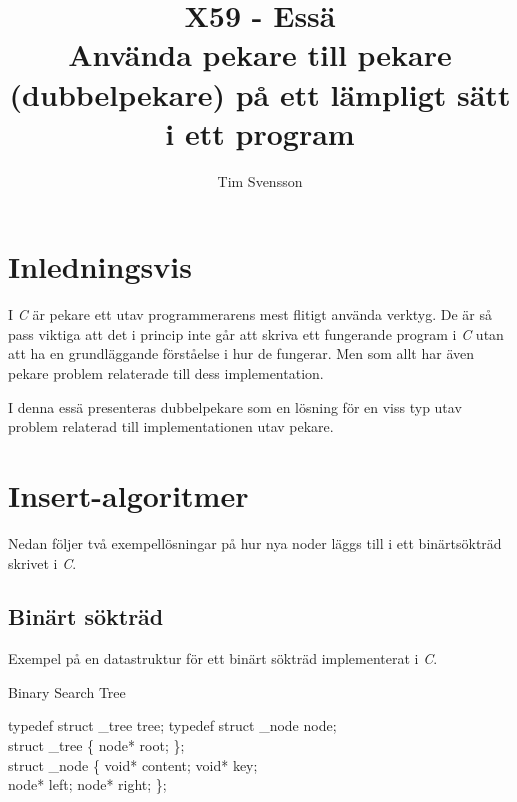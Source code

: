 \documentclass[a4paper]{article}
\title{X59 - Essä\\Använda pekare till pekare (dubbelpekare) på ett lämpligt sätt i ett program}
\author{Tim Svensson}
\date{}
\begin{document}

	\maketitle
		\pagebreak

	\section*{Inledningsvis} %

			I \emph{C} är pekare ett utav programmerarens mest flitigt använda verktyg. De är så pass viktiga att det i princip inte går att skriva ett fungerande program i \emph{C} utan att ha en grundläggande förståelse i hur de fungerar. Men som allt har även pekare problem relaterade till dess implementation.

			I denna essä presenteras dubbelpekare som en lösning för en viss typ utav problem relaterad till implementationen utav pekare.

	\section*{Insert-algoritmer}

		Nedan följer två exempellösningar på hur nya noder läggs till i ett binärtsökträd skrivet i \emph{C}.

		\subsection*{Binärt sökträd}

			Exempel på en datastruktur för ett binärt sökträd implementerat i \emph{C}.

			\begin{algorithm}
				\caption{Binary Search Tree}
				\label{Binary Tree}
				\begin{algorithmic}[1]
					\State typedef struct \_tree tree;
					\State typedef struct \_node node; \\
					
					\State struct \_tree \{
						\State \hspace{0.5cm} node* root;
						\State \}; \\
					
					\State struct \_node \{
						\State \hspace{0.5cm} void* content;
						\State \hspace{0.5cm} void* key; \\
					
						\State \hspace{0.5cm} node* left;
						\State \hspace{0.5cm} node* right;
					\State \};
				\end{algorithmic}
			\end{algorithm}
\end{document}
